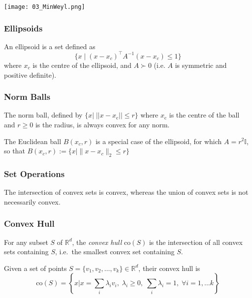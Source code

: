 \begin{center}
    \texttt{[image: 03\_MinWeyl.png]}
\end{center}

\subsubsection{Ellipsoids}
An ellipsoid is a set defined as
\begin{equation*}
    \{x \mid {(x - x_c)}^\top A^{-1}(x - x_c) \leq 1\}
\end{equation*}
where $x_c$ is the centre of the ellipsoid, and $A \succ 0$ (i.e. $A$ is symmetric and positive definite).   %

\subsubsection{Norm Balls}
The norm ball, defined by $\{x|\;||x-x_{\mathrm{c}}||\leq r\}$ where $x_{\mathrm{c}}$ is the centre of the ball
and $r\geq0$ is the radius, is always convex for any norm.
\newpar{}

The Euclidean ball $B(x_c,r)$ is a special case of the ellipsoid, for which $A=r^2 \mathbb{I}$, so that $B(x_c,r):=\{x| \|x-x_c\|_2\leq r\}$

\subsubsection{Set Operations}
The intersection of convex sets is convex, whereas the union of convex sets is not necessarily convex.

\subsubsection{Convex Hull}\label{ssec:convex_hull}
For any subset $S$ of $\mathbb{R}^d$, the \textit{convex hull} $\mathrm{co}(S)$ is the intersection of all convex sets containing $S$, i.e.\ the smallest convex set containing $S$.

\newpar{}

Given a set of points $S=\{v_1, v_2, \ldots, v_k\} \in \mathbb{R}^d$, their convex hull is
\begin{equation*}
    \mathrm{co}(S) = \left\{ x\Bigg| x = \sum_i \lambda_i v_i, \; \lambda_i \geq 0,\; \sum_i \lambda_i = 1,\; \forall i=1,\ldots k \right\}
\end{equation*}

